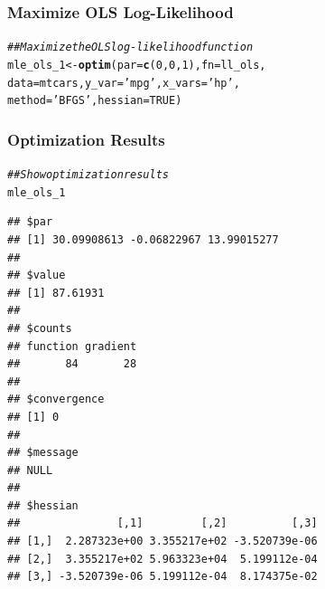 \documentclass{beamer}\usepackage[]{graphicx}\usepackage[]{color}
\makeatletter
\newcommand{\hlnum}[1]{\textcolor[rgb]{0.686,0.059,0.569}{#1}}%
\newcommand{\hlstr}[1]{\textcolor[rgb]{0.192,0.494,0.8}{#1}}%
\newcommand{\hlcom}[1]{\textcolor[rgb]{0.678,0.584,0.686}{\textit{#1}}}%
\newcommand{\hlstd}[1]{\textcolor[rgb]{0.345,0.345,0.345}{#1}}%
\newcommand{\hlkwb}[1]{\textcolor[rgb]{0.69,0.353,0.396}{#1}}%
\newcommand{\hlkwc}[1]{\textcolor[rgb]{0.333,0.667,0.333}{#1}}%
\newcommand{\hlkwd}[1]{\textcolor[rgb]{0.737,0.353,0.396}{\textbf{#1}}}%
\newenvironment{kframe}{%
 \def\at@end@of@kframe{}%
 \ifinner\ifhmode%
  \def\at@end@of@kframe{\end{minipage}}%
  \begin{minipage}{\columnwidth}%
 \fi\fi%
 \def\FrameCommand##1{\hskip\@totalleftmargin \hskip-\fboxsep
 \colorbox{shadecolor}{##1}\hskip-\fboxsep
     \hskip-\linewidth \hskip-\@totalleftmargin \hskip\columnwidth}%
 \MakeFramed {\advance\hsize-\width
   \@totalleftmargin\z@ \linewidth\hsize
   \@setminipage}}%
 {\par\unskip\endMakeFramed%
 \at@end@of@kframe}
\newenvironment{knitrout}{}{} %
\makeatother
\begin{document}
\begin{frame}[fragile]\frametitle{Maximize OLS Log-Likelihood}
\begin{knitrout}\footnotesize
{}\color{fgcolor}\begin{kframe}
\begin{alltt}
\hlcom{## Maximize the OLS log-likelihood function}
\hlstd{mle_ols_1} \hlkwb{<-} \hlkwd{optim}\hlstd{(}\hlkwc{par} \hlstd{=} \hlkwd{c}\hlstd{(}\hlnum{0}\hlstd{,} \hlnum{0}\hlstd{,} \hlnum{1}\hlstd{),} \hlkwc{fn} \hlstd{= ll_ols,}
                   \hlkwc{data} \hlstd{= mtcars,} \hlkwc{y_var} \hlstd{=} \hlstr{'mpg'}\hlstd{,} \hlkwc{x_vars} \hlstd{=} \hlstr{'hp'}\hlstd{,}
                   \hlkwc{method} \hlstd{=} \hlstr{'BFGS'}\hlstd{,} \hlkwc{hessian} \hlstd{=} \hlnum{TRUE}\hlstd{)}
\end{alltt}
\end{kframe}
\end{knitrout}
\end{frame}

\begin{frame}[fragile]\frametitle{Optimization Results}
\begin{knitrout}\scriptsize
{}\color{fgcolor}\begin{kframe}
\begin{alltt}
\hlcom{## Show optimization results}
\hlstd{mle_ols_1}
\end{alltt}
\begin{verbatim}
## $par
## [1] 30.09908613 -0.06822967 13.99015277
## 
## $value
## [1] 87.61931
## 
## $counts
## function gradient 
##       84       28 
## 
## $convergence
## [1] 0
## 
## $message
## NULL
## 
## $hessian
##               [,1]         [,2]          [,3]
## [1,]  2.287323e+00 3.355217e+02 -3.520739e-06
## [2,]  3.355217e+02 5.963323e+04  5.199112e-04
## [3,] -3.520739e-06 5.199112e-04  8.174375e-02
\end{verbatim}
\end{kframe}
\end{knitrout}
\end{frame}
\end{document}
